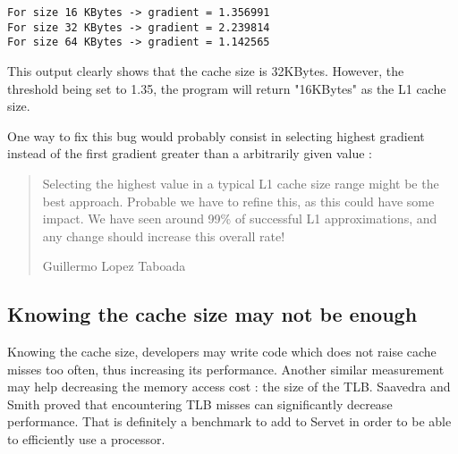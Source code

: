 \lstset{caption=A part of the output of $./job.sh est_cache$ on a Nehalem E5504}
\begin{lstlisting}
For size 16 KBytes -> gradient = 1.356991 
For size 32 KBytes -> gradient = 2.239814 
For size 64 KBytes -> gradient = 1.142565 
\end{lstlisting}

This output clearly shows that the cache size is 32KBytes. However, the
threshold being set to 1.35, the program will return "16KBytes" as the L1 cache
size.

One way to fix this bug would probably consist in selecting highest gradient
instead of the first gradient greater than a arbitrarily given value :

\begin{quotation}
Selecting the highest value in a typical L1 cache size range might be the best
approach. Probable we have to refine this, as this could have some impact. We
have seen around 99\% of successful L1 approximations, and any change should
increase this overall rate! 
\begin{flushright}Guillermo Lopez Taboada\end{flushright}
\end{quotation}

\subsection{Knowing the cache size may not be enough}
Knowing the cache size, developers may write code which does not raise cache
misses too often, thus increasing its performance. Another similar measurement
may help decreasing the memory access cost : the size of the TLB. Saavedra and
Smith\cite{Cache_TLB} proved that encountering TLB misses can significantly
decrease performance. That is definitely a benchmark to add to Servet in order
to be able to efficiently use a processor.


